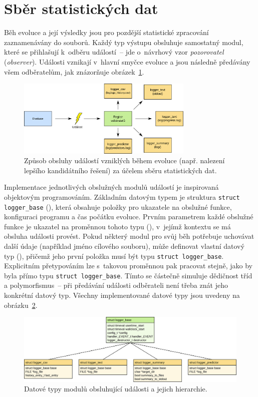 \section{Sběr statistických dat}
\label{secImplExperimental}

Běh evoluce a její výsledky jsou pro pozdější statistické zpracování zaznamenávány do souborů. Každý typ výstupu obsluhuje samostatný modul, které se přihlašují k~odběru událostí~-- jde o~návrhový vzor \emph{pozorovatel} (\emph{observer}). Události vznikají v~hlavní smyčce evoluce a jsou následně předávány všem odběratelům, jak znázorňuje obrázek~\ref{obrLoggersHandling}.

\begin{figure}[b]
    \centering
    \includegraphics[width=0.75\textwidth]{fig/loggerevent}
    \caption{Způsob obsluhy událostí vzniklých během evoluce (např. nalezení lepšího kandidátního řešení) za účelem sběru statistických dat.}
    \label{obrLoggersHandling}
\end{figure}

Implementace jednotlivých obslužných modulů událostí je inspirovaná objektovým programováním. Základním datovým typem je struktura \texttt{struct logger\_base} (), která obsahuje položky pro ukazatele na obslužné funkce, konfiguraci programu a čas počátku evoluce. Prvním parametrem každé obslužné funkce je ukazatel na proměnnou tohoto typu (), v~jejímž kontextu se má obsluha události provést. Pokud některý modul pro svůj běh potřebuje uchovávat další údaje (například jméno cílového souboru), může definovat vlastní datový typ (), přičemž jeho první položka musí být typu \texttt{struct logger\_base}. Explicitním přetypováním lze s~takovou proměnnou pak pracovat stejně, jako by byla přímo typu \texttt{struct logger\_base}. Tímto se částečně simuluje dědičnost tříd a polymorfismus~-- při předávání události odběrateli není třeba znát jeho konkrétní datový typ. Všechny implementované datové typy jsou uvedeny na obrázku~\ref{obrLoggersTypes}.

\begin{figure}[htb]
    \centering
    \includegraphics[width=\textwidth]{fig/loggertypes}
    \caption{Datové typy modulů obsluhující události a jejich hierarchie.}
    \label{obrLoggersTypes}
\end{figure}

